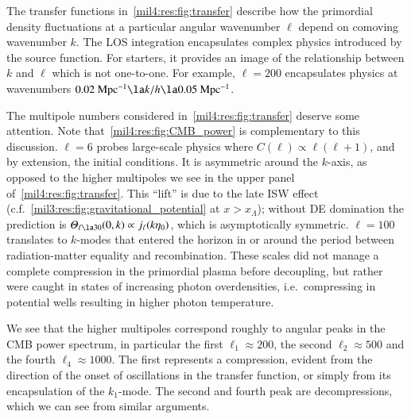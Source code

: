 



The transfer functions in~\cref{mil4:res:fig:transfer} describe how the primordial density fluctuations at a particular angular wavenumber $\ell$ depend on comoving wavenumber $k$. The LOS integration encapsulates complex physics introduced by the source function. For starters, it provides an image of the relationship between $k$ and $\ell$ which is not one-to-one. For example, $\ell=200$ encapsulates physics at wavenumbers $0.02\unit{Mpc^{-1}} \la k/h \la 0.05\unit{Mpc^{-1}}$.

The multipole numbers considered in~\cref{mil4:res:fig:transfer} deserve some attention. Note that~\cref{mil4:res:fig:CMB_power} is complementary to this discussion. $\ell=6$ probes large-scale physics where $C(\ell) \propto \ell(\ell+1)$, and by extension, the initial conditions. It is asymmetric around the $k$-axis, as opposed to the higher multipoles we see in the upper panel of~\cref{mil4:res:fig:transfer}. This ``lift'' is due to the late ISW effect (c.f.~\cref{mil3:res:fig:gravitational_potential} at $x>x_\Lambda$); without DE domination the prediction is $\Theta_{\ell\la 30}(0, k)\propto j_\ell(k\eta_0)$, which is asymptotically symmetric. $\ell=100$ translates to $k$-modes that entered the horizon in or around the period between radiation-matter equality and recombination. These scales did not manage a complete compression in the primordial plasma before decoupling, but rather were caught in states of increasing photon overdensities, i.e.~compressing in potential wells resulting in higher photon temperature.  

We see that the higher multipoles correspond roughly to angular peaks in the CMB power spectrum, in particular the first $\ell_1 \approx 200$, the second $\ell_2 \approx 500$ and the fourth $\ell_4\approx 1000$. The first represents a compression, evident from the direction of the onset of oscillations in the transfer function, or simply from its encapsulation of the $k_1$-mode. The second and fourth peak are decompressions, which we can see from similar arguments.



